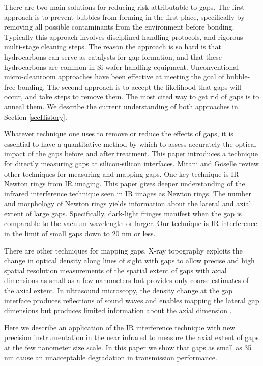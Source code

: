 \documentclass[osajnl,preprint,showpacs,superscriptaddress,12pt]{revtex4-1} %
\begin{document}
There are two main solutions for reducing risk attributable to gaps.  The first approach is to prevent bubbles from forming in the first place, specifically by removing all possible contaminants from the environment before bonding.  Typically this approach involves disciplined handling protocols, and rigorous multi-stage cleaning steps.  The reason the approach is so hard is that hydrocarbons can serve as catalysts for gap formation\cite{1991JaJAP..30..615M}, and that these hydrocarbons are common in Si wafer handling equipment.  Unconventional micro-cleanroom approaches have been effective at meeting the goal of bubble-free bonding\cite{1989JaJAP..28L2141L}.  The second approach is to accept the likelihood that gaps will occur, and take steps to remove them.  The most cited way to get rid of gaps is to anneal them\cite{Mitani1990}.  We describe the current understanding of both approaches in Section \ref{secHistory}.

Whatever technique one uses to remove or reduce the effects of gaps, it is essential to have a quantitative method by which to assess accurately the optical impact of the gaps before and after treatment.  This paper introduces a technique for directly measuring gaps at silicon-silicon interfaces.  Mitani and G\"oselle review other techniques for measuring and mapping gaps\cite{1992JEMat..21..669M}.  One key technique is IR Newton rings from IR imaging\cite{Mitani1990}.  This paper gives deeper understanding of the infrared interference technique seen in IR images as Newton rings.  The number and morphology of Newton rings yields information about the lateral and axial extent of large gaps. Specifically, dark-light fringes manifest when the gap is comparable to the vacuum wavelength or larger.  Our technique is IR interference in the limit of small gaps down to 20 nm or less.  

There are other techniques for mapping gaps.  X-ray topography \cite{1992JEMat..21..669M,1994JaJAP..33....6H} exploits the change in optical density along lines of sight with gaps to allow precise and high spatial resolution measurements of the spatial extent of gaps with axial dimensions as small as a few nanometers but provides only coarse estimates of the axial extent.  In ultrasound microscopy, the density change at the gap interface produces reflections of sound waves and enables mapping the lateral gap dimensions but produces limited information about the axial dimension \cite{2000RScI...71.1869G}.  

Here we describe an application of the IR interference technique with new precision instrumentation in the near infrared to measure the axial extent of gaps at the few nanometer size scale.  In this paper we show that gaps as small as 35 nm cause an unacceptable degradation in transmission performance.  
\end{document}
